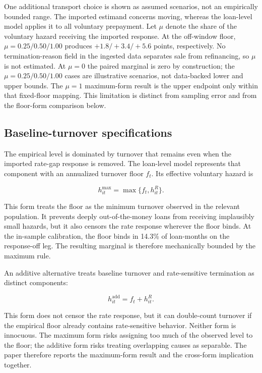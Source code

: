 One additional transport choice is shown as assumed scenarios, not an empirically bounded range. The imported estimand concerns moving, whereas the loan-level model applies it to all voluntary prepayment. Let $\mu$ denote the share of the voluntary hazard receiving the imported response. At the off-window floor, $\mu=0.25/0.50/1.00$ produces $+1.8/+3.4/+5.6$ points, respectively. No termination-reason field in the ingested data separates sale from refinancing, so $\mu$ is not estimated. At $\mu=0$ the paired marginal is zero by construction; the $\mu=0.25/0.50/1.00$ cases are illustrative scenarios, not data-backed lower and upper bounds. The $\mu=1$ maximum-form result is the upper endpoint only within that fixed-floor mapping. This limitation is distinct from sampling error and from the floor-form comparison below.

\subsection{Baseline-turnover specifications}

The empirical level is dominated by turnover that remains even when the imported rate-gap response is removed. The loan-level model represents that component with an annualized turnover floor $f_t$. Its effective voluntary hazard is

\begin{equation}
h^{\max}_{it}=\max\{f_t,h^{R}_{it}\}.
\label{eq:maxfloor}
\end{equation}

This form treats the floor as the minimum turnover observed in the relevant population. It prevents deeply out-of-the-money loans from receiving implausibly small hazards, but it also censors the rate response wherever the floor binds. At the in-sample calibration, the floor binds in 14.3\% of loan-months on the response-off leg. The resulting marginal is therefore mechanically bounded by the maximum rule.

An additive alternative treats baseline turnover and rate-sensitive termination as distinct components:

\begin{equation}
h^{\mathrm{add}}_{it}=f_t+h^{R}_{it}.
\label{eq:addfloor}
\end{equation}

This form does not censor the rate response, but it can double-count turnover if the empirical floor already contains rate-sensitive behavior. Neither form is innocuous. The maximum form risks assigning too much of the observed level to the floor; the additive form risks treating overlapping causes as separable. The paper therefore reports the maximum-form result and the cross-form implication together.

